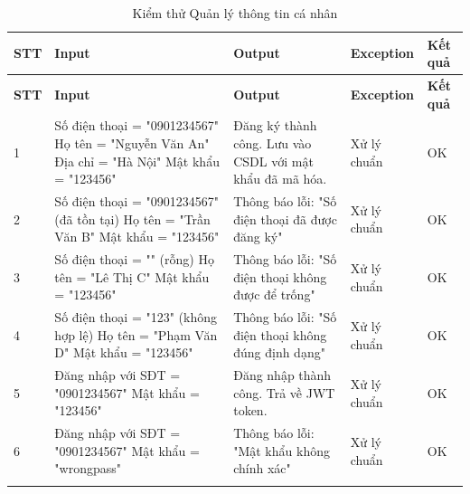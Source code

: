 \begin{longtable}{|p{1cm}|p{5cm}|p{4cm}|p{3cm}|p{1.5cm}|}
\hline
\textbf{STT} & \textbf{Input} & \textbf{Output} & \textbf{Exception} & \textbf{Kết quả} \\
\hline
\endfirsthead

\hline
\textbf{STT} & \textbf{Input} & \textbf{Output} & \textbf{Exception} & \textbf{Kết quả} \\
\hline
\endhead

\hline
\endfoot

1 & Số điện thoại = "0901234567" \newline Họ tên = "Nguyễn Văn An" \newline Địa chỉ = "Hà Nội" \newline Mật khẩu = "123456" & Đăng ký thành công. Lưu vào CSDL với mật khẩu đã mã hóa. & Xử lý chuẩn & OK \\
\hline

2 & Số điện thoại = "0901234567" (đã tồn tại) \newline Họ tên = "Trần Văn B" \newline Mật khẩu = "123456" & Thông báo lỗi: "Số điện thoại đã được đăng ký" & Xử lý chuẩn & OK \\
\hline

3 & Số điện thoại = "" (rỗng) \newline Họ tên = "Lê Thị C" \newline Mật khẩu = "123456" & Thông báo lỗi: "Số điện thoại không được để trống" & Xử lý chuẩn & OK \\
\hline

4 & Số điện thoại = "123" (không hợp lệ) \newline Họ tên = "Phạm Văn D" \newline Mật khẩu = "123456" & Thông báo lỗi: "Số điện thoại không đúng định dạng" & Xử lý chuẩn & OK \\
\hline

5 & Đăng nhập với SĐT = "0901234567" \newline Mật khẩu = "123456" & Đăng nhập thành công. Trả về JWT token. & Xử lý chuẩn & OK \\
\hline

6 & Đăng nhập với SĐT = "0901234567" \newline Mật khẩu = "wrongpass" & Thông báo lỗi: "Mật khẩu không chính xác" & Xử lý chuẩn & OK \\
\hline

\caption{Kiểm thử Quản lý thông tin cá nhân}
\end{longtable}

